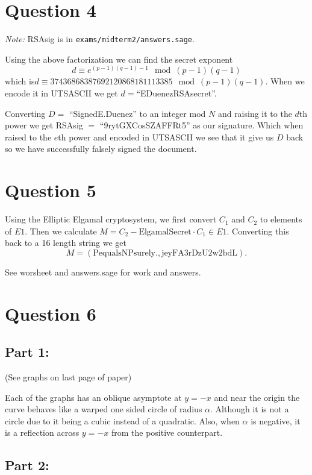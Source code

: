 \documentclass[12pt,letterpaper]{article}
\begin{document}
\section*{Question 4}
    
    \textit{Note:} RSAsig is in \texttt{exams/midterm2/answers.sage}.
    
    Using the above factorization we can find the secret exponent 
    $$d \equiv e^{(p-1)(q-1)-1} \mod{(p-1)(q-1)}$$
    which is$d \equiv 37436868387692120868181113385 \mod{(p-1)(q-1)}$. When we encode it in UTSASCII we get $d =$``EDuenezRSAsecret''.
    
    Converting $D =$ ``Signed\underline{\space\space}E.\underline{\space\space}Duenez'' to an integer mod $N$ and raising it to the $d$th power we get RSAsig $=$ ``9rytGXCos\underline{\space\space}SZAFFRt5'' as our signature. Which when raised to the $e$th power and encoded in UTSASCII we see that it give us $D$ back so we have successfully falsely signed the document.
    
\section*{Question 5}

    Using the Elliptic Elgamal cryptosystem, we first convert $C_1$ and $C_2$ to elements of $E1$. Then we calculate $M = C_2 - \text{ElgamalSecret}\cdot C_1\in E1$. Converting this back to a 16 length string we get 
    $$M = (\text{PequalsNPsurely.}, \text{jeyFA3rDzU2w2bdL}).$$

    See worsheet and answers.sage for work and answers.

\section*{Question 6}
\subsection*{Part 1:}
    (See graphs on last page of paper)
    
    Each of the graphs has an oblique asymptote at $y=-x$ and near the origin the curve behaves like a warped one sided circle of radius $\alpha$. Although it is not a circle due to it being a cubic instead of a quadratic. Also, when $\alpha$ is negative, it is a reflection across $y=-x$ from the positive counterpart.
\subsection*{Part 2:}
\end{document}
